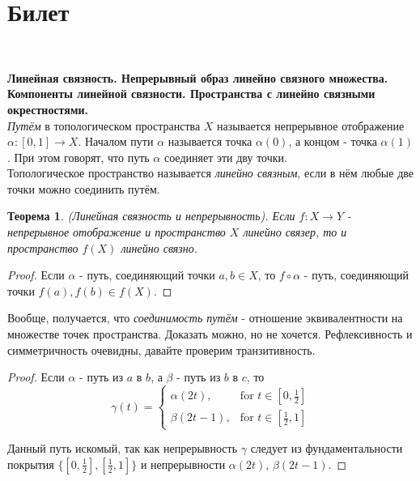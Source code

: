 \documentclass[a4paper,100pt]{article}
\theoremstyle{indented}
\newtheorem{theorem}{Теорема}
\begin{document}
\section{Билет} \

\medskip

\textbf{Линейная связность. Непрерывный образ линейно связного множества. Компоненты линейной связности. Пространства с линейно связными окрестностями.}\\

\textit{Путём} в топологическом пространства $X$ называется непрерывное отображение $\alpha: [0,1]\rightarrow X$. Началом пути $\alpha$ называется точка $\alpha(0)$, а концом - точка $\alpha(1)$. При этом говорят, что путь $\alpha$ соединяет эти дву точки.\\

Топологическое пространство называется \textit{линейно связным}, если в нём любые две точки можно соединить путём.\\

\begin{theorem}
    (Линейная связность и непрерывность). Если $f: X\rightarrow Y$ - непрерывное отображение и пространство $X$ линейно связер, то и пространство $f(X)$ линейно связно.
\end{theorem}

\begin{proof}
    Если $\alpha$ - путь, соединяющий точки $a,b\in X$, то $f\circ \alpha$ - путь, соединяющий точки $f(a),f(b)\in f(X)$.
\end{proof}

Вообще, получается, что \textit{соединимость путём} - отношение эквивалентности на множестве точек пространства. Доказать можно, но не хочется. Рефлексивность и симметричность очевидны, давайте проверим транзитивность.

\begin{proof}

    Если $\alpha$ - путь из $a$ в $b$, а $\beta$ - путь из $b$ в $c$, то 
    $$
        \gamma(t) = 
            \begin{cases}
    \alpha(2t), & \text{for } t\in[0,\frac12] \\
    \beta(2t-1), & \text{for } t\in[\frac12,1]
            \end{cases}
    $$

    Данный путь искомый, так как непрерывность $\gamma$ следует из фундаментальности покрытия $\{[0,\frac12],[\frac12,1]\}$ и непрерывности $\alpha(2t)$, $\beta(2t-1)$.

\end{proof}
\end{document}
